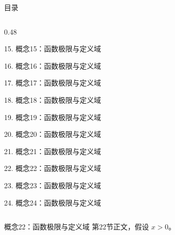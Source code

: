 \documentclass[aspectratio=169,10pt,fontset=fandol]{ctexbeamer}
\begin{document}
\begin{frame}[t,fragile]{目录}
\begin{columns}[T,onlytextwidth]
\begin{column}{0.48\textwidth}
{\color{black}\small 15. 概念15：函数极限与定义域\par}\vspace{0.22em}
{\color{black}\small 16. 概念16：函数极限与定义域\par}\vspace{0.22em}
{\color{black}\small 17. 概念17：函数极限与定义域\par}\vspace{0.22em}
{\color{black}\small 18. 概念18：函数极限与定义域\par}\vspace{0.22em}
{\color{black}\small 19. 概念19：函数极限与定义域\par}\vspace{0.22em}
{\color{black}\small 20. 概念20：函数极限与定义域\par}\vspace{0.22em}
{\color{black}\small 21. 概念21：函数极限与定义域\par}\vspace{0.22em}
{\color{blue}\small 22. 概念22：函数极限与定义域\par}\vspace{0.22em}
{\color{gray!40}\small 23. 概念23：函数极限与定义域\par}\vspace{0.22em}
{\color{gray!40}\small 24. 概念24：函数极限与定义域\par}\vspace{0.22em}
\end{column}
\end{columns}
\end{frame}
\begin{frame}[t,fragile]{概念22：函数极限与定义域}
\normalsize
{\normalsize
第22节正文，假设 $x>0$。
}
\end{frame}
\end{document}

